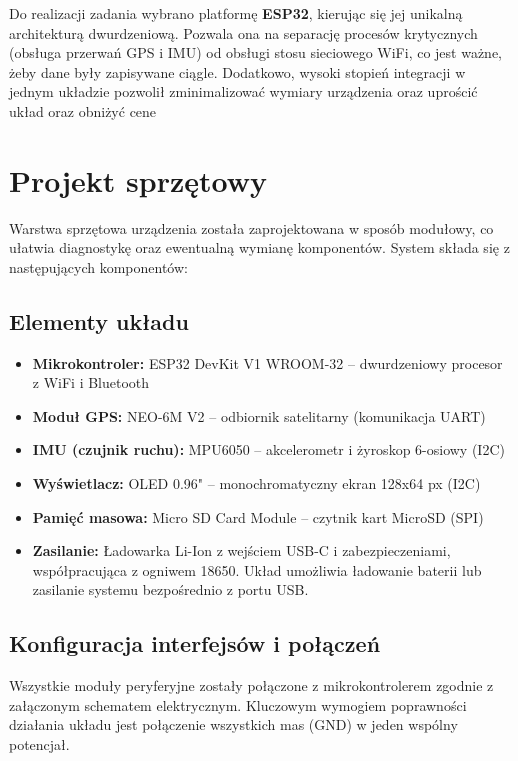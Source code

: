 \documentclass[12pt, a4paper]{EE-dyplom}
\begin{document}
Do realizacji zadania wybrano platformę \textbf{ESP32}, kierując się jej unikalną architekturą dwurdzeniową.
Pozwala ona na separację procesów krytycznych (obsługa przerwań GPS i IMU) od obsługi stosu sieciowego WiFi, 
co jest ważne, żeby dane były zapisywane ciągle. Dodatkowo, wysoki stopień integracji  
w jednym układzie pozwolił zminimalizować wymiary urządzenia oraz uprościć układ oraz obniżyć cene 


\section{Projekt sprzętowy}


Warstwa sprzętowa urządzenia została zaprojektowana w sposób modułowy, co ułatwia diagnostykę oraz ewentualną wymianę komponentów. System składa się z następujących komponentów:

\subsection{Elementy układu}

\begin{itemize}
    \item \textbf{Mikrokontroler:} ESP32 DevKit V1 WROOM-32 – dwurdzeniowy procesor z WiFi i Bluetooth
    \item \textbf{Moduł GPS:} NEO-6M V2 – odbiornik satelitarny (komunikacja UART)
    \item \textbf{IMU (czujnik ruchu):} MPU6050 – akcelerometr i żyroskop 6-osiowy (I2C)
    \item \textbf{Wyświetlacz:} OLED 0.96" – monochromatyczny ekran 128x64 px (I2C)
    \item \textbf{Pamięć masowa:} Micro SD Card Module – czytnik kart MicroSD (SPI)
    \item \textbf{Zasilanie:} Ładowarka Li-Ion z wejściem USB-C i zabezpieczeniami, współpracująca z ogniwem 18650. Układ umożliwia ładowanie baterii lub zasilanie systemu bezpośrednio z portu USB.
\end{itemize}

\subsection{Konfiguracja interfejsów i połączeń}
Wszystkie moduły peryferyjne zostały połączone z mikrokontrolerem zgodnie z załączonym schematem elektrycznym. Kluczowym wymogiem poprawności działania układu jest połączenie wszystkich mas (GND) w jeden wspólny potencjał.
\end{document}
